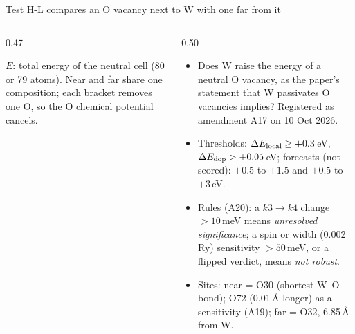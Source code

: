 \begin{frame}{Test H-L compares an O vacancy next to W with one far from it}
\begin{columns}[T,onlytextwidth]
\begin{column}{0.47\textwidth}
      \vspace{0.6mm}
      \raggedright{\scriptsize $E$: total energy of the neutral cell (80 or 79 atoms). Near and far share one
        composition; each bracket removes one O, so the O chemical potential cancels.\par}
    \end{column}
    \begin{column}{0.50\textwidth}
      \begin{itemize}
        \item Does W raise the energy of a neutral O vacancy, as the paper's statement that W passivates O
          vacancies implies? Registered as amendment A17 on 10 Oct 2026.
        \item Thresholds: $\Delta E_{\mathrm{local}} \ge +0.3$\,eV, $\Delta E_{\mathrm{dop}} > +0.05$\,eV; forecasts (not scored): $+0.5$ to
          $+1.5$ and $+0.5$ to $+3$\,eV.
        \item Rules (A20): a $k3\to k4$ change $>10$\,meV means \emph{unresolved significance}; a spin or width
          (0.002\,Ry) sensitivity $>50$\,meV, or a flipped verdict, means \emph{not robust}.
        \item Sites: near = O30 (shortest W--O bond); O72 (0.01\,\AA{} longer) as a sensitivity (A19); far = O32,
          6.85\,\AA{} from W.
      \end{itemize}
    \end{column}
  \end{columns}
\end{frame}

